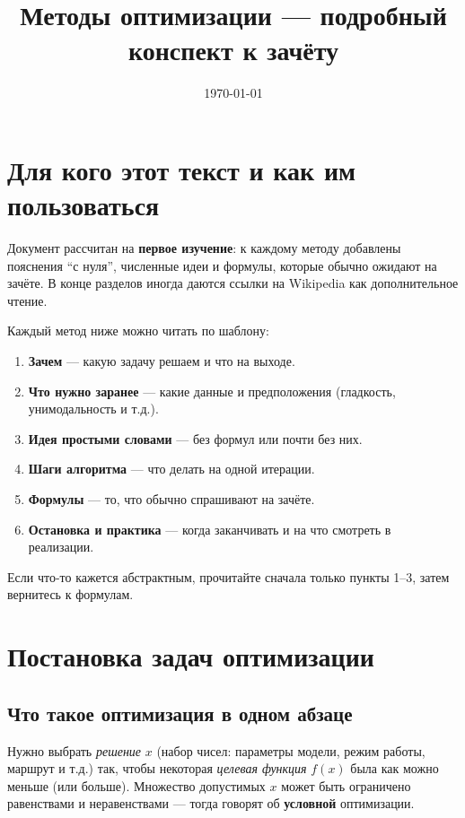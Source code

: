 \documentclass[12pt,a4paper]{article}
\title{Методы оптимизации --- подробный конспект к зачёту}
\author{}
\date{\today}
\begin{document}
\maketitle

\section*{Для кого этот текст и как им пользоваться}
Документ рассчитан на \textbf{первое изучение}: к каждому методу добавлены пояснения ``с нуля'', численные идеи и формулы, которые обычно ожидают на зачёте. В конце разделов иногда даются ссылки на Wikipedia как дополнительное чтение.

Каждый метод ниже можно читать по шаблону:
\begin{enumerate}[label=\textbf{\arabic*.}]
  \item \textbf{Зачем} --- какую задачу решаем и что на выходе.
  \item \textbf{Что нужно заранее} --- какие данные и предположения (гладкость, унимодальность и т.д.).
  \item \textbf{Идея простыми словами} --- без формул или почти без них.
  \item \textbf{Шаги алгоритма} --- что делать на одной итерации.
  \item \textbf{Формулы} --- то, что обычно спрашивают на зачёте.
  \item \textbf{Остановка и практика} --- когда заканчивать и на что смотреть в реализации.
\end{enumerate}
Если что-то кажется абстрактным, прочитайте сначала только пункты 1--3, затем вернитесь к формулам.

\tableofcontents
\bigskip

\section{Постановка задач оптимизации}

\subsection{Что такое оптимизация в одном абзаце}
Нужно выбрать \emph{решение} \(x\) (набор чисел: параметры модели, режим работы, маршрут и т.д.) так, чтобы некоторая \emph{целевая функция} \(f(x)\) была как можно меньше (или больше). Множество допустимых \(x\) может быть ограничено равенствами и неравенствами --- тогда говорят об \textbf{условной} оптимизации.
\end{document}
